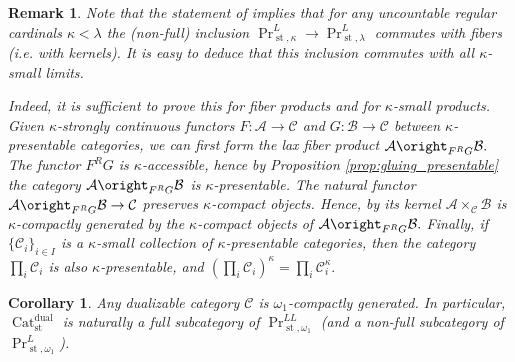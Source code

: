 \documentclass[11pt,leqno]{amsart}
\newtheorem{cor}[theo]{Corollary}
\newtheorem{remark}[theo]{Remark}
\numberwithin{equation}{section}
\newcommand{\indlim}[1][]{\mathop{\varinjlim}\limits_{#1}}
\newcommand{\inddlim}[1][]{{``{\indlim[#1]}"}}
\newcommand{\prodd}[1][]{\mathop{\prod}\limits_{#1}}
\newcommand{\xto}{\xrightarrow}
\newcommand{\Cat}{\operatorname{Cat}}
\newcommand{\st}{\operatorname{st}}
\newcommand{\dual}{\operatorname{dual}}
\newcommand{\cA}{{\mathcal A}}
\newcommand{\cB}{{\mathcal B}}
\newcommand{\cC}{{\mathcal C}}
\newcommand{\Ind}{\operatorname{Ind}}
\begin{document}
\begin{remark}Note that the statement of \cite[Theorem 7.4.1]{Kr} implies that for any uncountable regular cardinals $\kappa<\lambda$ the (non-full) inclusion $\Pr^L_{\st,\kappa}\to\Pr^L_{\st,\lambda}$ commutes with fibers (i.e. with kernels). It is easy to deduce that this inclusion commutes with all $\kappa$-small limits. 

Indeed, it is sufficient to prove this for fiber products and for $\kappa$-small products. Given $\kappa$-strongly continuous functors $F:\cA\to\cC$ and $G:\cB\to\cC$ between $\kappa$-presentable categories, we can first form the lax fiber product $\cA\oright_{F^R G}\cB.$ The functor $F^R G$ is $\kappa$-accessible, hence by Proposition \ref{prop:gluing_presentable} the category $\cA\oright_{F^R G}\cB$ is $\kappa$-presentable. The natural functor $\cA\oright_{F^R G}\cB\to\cC$ preserves $\kappa$-compact objects. Hence, by \cite[Theorem 7.4.1]{Kr} its kernel $\cA\times_{\cC}\cB$ is $\kappa$-compactly generated by the $\kappa$-compact objects of $\cA\oright_{F^R G}\cB.$ Finally, if $\{\cC_i\}_{i\in I}$ is a $\kappa$-small collection of $\kappa$-presentable categories, then the category $\prodd[i]\cC_i$ is also $\kappa$-presentable, and $(\prodd[i]\cC_i)^{\kappa}=\prodd[i]\cC_i^{\kappa}.$\end{remark}



\begin{cor}\label{cor:dualizable_is_aleph_1_generated} Any dualizable category $\cC$ is $\omega_1$-compactly generated. In particular, $\Cat_{\st}^{\dual}$ is naturally a full subcategory of $\Pr^{LL}_{\st,\omega_1}$ (and a non-full subcategory of $\Pr^L_{\st,\omega_1}$).\end{cor}
\end{document}

